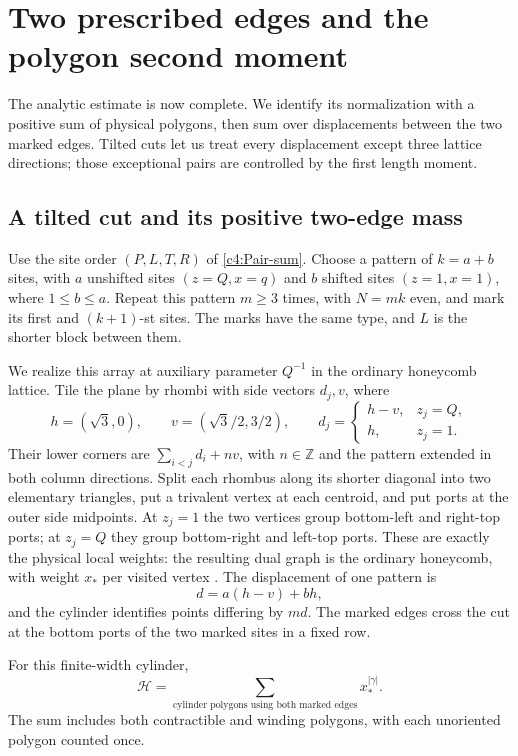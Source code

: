 \section{Two prescribed edges and the polygon second moment}\label{c4:metric-consequences}

The analytic estimate is now complete. We identify its normalization
with a positive sum of physical polygons, then sum over displacements
between the two marked edges. Tilted cuts let us treat every displacement
except three lattice directions; those exceptional pairs are controlled
by the first length moment.

\subsection{A tilted cut and its positive two-edge mass}

Use the site order $(P,L,T,R)$ of \eqref{c4:Pair-sum}. Choose a pattern
of $k=a+b$ sites, with $a$ unshifted sites $(z=Q,x=q)$ and $b$ shifted
sites $(z=1,x=1)$, where $1\le b\le a$. Repeat this pattern $m\ge3$
times, with $N=mk$ even, and mark its first and $(k+1)$-st sites.
The marks have the same type, and $L$ is the shorter block between them.

We realize this array at auxiliary parameter $Q^{-1}$ in the ordinary
honeycomb lattice. Tile the plane by rhombi with side vectors $d_j,v$,
where
\[
 h=(\sqrt3,0),\qquad v=(\sqrt3/2,3/2),\qquad
 d_j=\begin{cases}h-v,&z_j=Q,\\h,&z_j=1.\end{cases}
\]
Their lower corners are $\sum_{i<j}d_i+nv$, with $n\in\mathbb Z$ and
the pattern extended in both column directions. Split each rhombus
along its shorter diagonal into two elementary triangles, put a
trivalent vertex at each centroid, and put ports at the outer side
midpoints. At $z_j=1$ the two vertices group bottom-left and right-top
ports; at $z_j=Q$ they group bottom-right and left-top ports. These are
exactly the physical local weights: the resulting dual graph is the
ordinary honeycomb, with weight $x_*$ per visited vertex
\cite{GlazmanManolescu2017,ZhouBatchelor1997}.
The displacement of one pattern is
\[
 d=a(h-v)+bh,
\]
and the cylinder identifies points differing by $md$. The marked edges
cross the cut at the bottom ports of the two marked sites in a fixed row.

\begin{proposition}
\label{prop:two-mark-positive}
For this finite-width cylinder,
\begin{equation}
 \mathscr H=
 \sum_{\text{cylinder polygons using both marked edges}}
                              x_*^{|\gamma|}.                         \label{c4:Geom-2}
\end{equation}
The sum includes both contractible and winding polygons, with each
unoriented polygon counted once.
\end{proposition}

